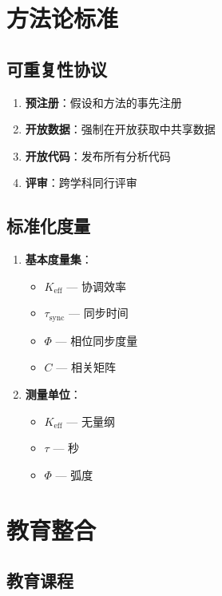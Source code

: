 \documentclass[12pt,a4paper]{article}
\begin{document}
	\section{方法论标准}
	
	\subsection{可重复性协议}
	
	\begin{enumerate}
		\item \textbf{预注册}：假设和方法的事先注册
		\item \textbf{开放数据}：强制在开放获取中共享数据
		\item \textbf{开放代码}：发布所有分析代码
		\item \textbf{评审}：跨学科同行评审
	\end{enumerate}
	
	\subsection{标准化度量}
	
	\begin{enumerate}
		\item \textbf{基本度量集}：
		\begin{itemize}
			\item $K_{\mathrm{eff}}$ — 协调效率
			\item $\tau_{\mathrm{sync}}$ — 同步时间
			\item $\Phi$ — 相位同步度量
			\item $C$ — 相关矩阵
		\end{itemize}
		
		\item \textbf{测量单位}：
		\begin{itemize}
			\item $K_{\mathrm{eff}}$ — 无量纲
			\item $\tau$ — 秒
			\item $\Phi$ — 弧度
		\end{itemize}
	\end{enumerate}
	
	\section{教育整合}
	
	\subsection{教育课程}
	
\end{document}
